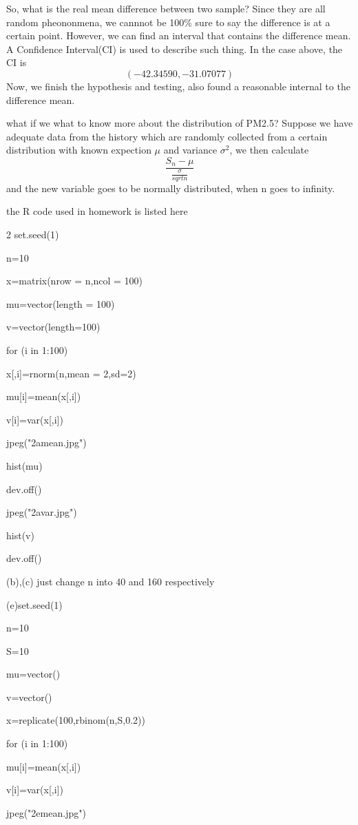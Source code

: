 \documentclass{article}
\begin{document}
So, what is the real mean difference between two sample? Since they are all random pheononmena, we cannnot be 100\% sure to say the difference is at a certain point. However, we can find an interval that contains the difference mean. A Confidence Interval(CI) is used to describe such thing. In the case above, the CI is \[(-42.34590 , -31.07077)\]
Now, we finish the hypothesis and testing, also found a reasonable internal to the difference mean.

what if we what to know more about the distribution of PM2.5? Suppose we have adequate data from the history which are randomly collected from a certain distribution with known expection $\mu$ and variance $\sigma^2$, we then calculate \[\frac{S_n-\mu}{\frac{\sigma}{sqrt{n}}}\] 
and the new variable goes to be normally distributed, when n goes to infinity.
\newpage
\appendixpage


the R code used in homework is listed here

2
set.seed(1)

n=10

x=matrix(nrow = n,ncol = 100)

mu=vector(length = 100)

v=vector(length=100)

for (i in 1:100) {

  x[,i]=rnorm(n,mean = 2,sd=2)

  mu[i]=mean(x[,i])

  v[i]=var(x[,i])

}

jpeg("2amean.jpg")

hist(mu)

dev.off()

jpeg("2avar.jpg")

hist(v)

dev.off()

(b),(c) just change n into 40 and 160 respectively

(e)set.seed(1)

n=10

S=10

mu=vector()

v=vector()

x=replicate(100,rbinom(n,S,0.2))

for (i in 1:100) {

mu[i]=mean(x[,i])

v[i]=var(x[,i])

}

jpeg("2emean.jpg")
\end{document}
